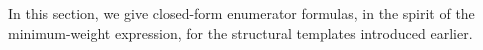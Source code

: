 \documentclass[conference]{IEEEtran}
\theoremstyle{definition}
\newcommand{\I}{\mathcal{I}}
\newcommand{\Stab}{\operatorname{Stab}}
\newcommand{\Alow}{{\rm LTA}(m,2)}
\begin{document}
In this section, we give closed-form enumerator formulas, in the spirit of the minimum-weight expression, for the structural templates introduced earlier.




\end{document}
